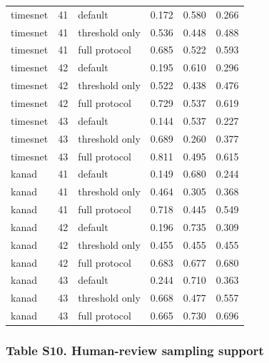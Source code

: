 \documentclass[a4paper,11pt]{article}
\begin{document}
{\begin{longtable}[]{@{}llllll@{}}
timesnet & 41 & default & 0.172 & 0.580 & 0.266 \\
timesnet & 41 & threshold only & 0.536 & 0.448 & 0.488 \\
timesnet & 41 & full protocol & 0.685 & 0.522 & 0.593 \\
timesnet & 42 & default & 0.195 & 0.610 & 0.296 \\
timesnet & 42 & threshold only & 0.522 & 0.438 & 0.476 \\
timesnet & 42 & full protocol & 0.729 & 0.537 & 0.619 \\
timesnet & 43 & default & 0.144 & 0.537 & 0.227 \\
timesnet & 43 & threshold only & 0.689 & 0.260 & 0.377 \\
timesnet & 43 & full protocol & 0.811 & 0.495 & 0.615 \\
kanad & 41 & default & 0.149 & 0.680 & 0.244 \\
kanad & 41 & threshold only & 0.464 & 0.305 & 0.368 \\
kanad & 41 & full protocol & 0.718 & 0.445 & 0.549 \\
kanad & 42 & default & 0.196 & 0.735 & 0.309 \\
kanad & 42 & threshold only & 0.455 & 0.455 & 0.455 \\
kanad & 42 & full protocol & 0.683 & 0.677 & 0.680 \\
kanad & 43 & default & 0.244 & 0.710 & 0.363 \\
kanad & 43 & threshold only & 0.668 & 0.477 & 0.557 \\
kanad & 43 & full protocol & 0.665 & 0.730 & 0.696 \\
\end{longtable}
}

\subsubsection{Table S10. Human-review sampling support}\label{table-s10.-human-review-sampling-support}
\end{document}
